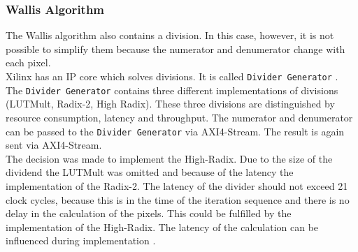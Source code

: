 \subsubsection*{Wallis Algorithm}
The Wallis algorithm also contains a division. In this case, however, it is not
possible to simplify them
because the numerator and denumerator change with each pixel. \\
Xilinx has an IP core which solves divisions. It is called \texttt{Divider Generator} \cite{divider}. The \texttt{Divider Generator} contains three different implementations of divisions (LUTMult, Radix-2, High Radix). These three divisions are distinguished by resource consumption, latency and throughput. The numerator and denumerator can be passed to the \texttt{Divider Generator} via AXI4-Stream. The result is again sent via AXI4-Stream. \\
The decision was made to implement the High-Radix. Due to the size of the dividend the LUTMult was omitted and because of the latency the implementation of the Radix-2. The latency of the divider should not exceed 21 clock cycles, because this is in the time of the iteration sequence and there is no delay in the calculation of the pixels. This could be fulfilled by the implementation of the High-Radix. The latency of the calculation can be influenced during implementation \cite{divider}.

